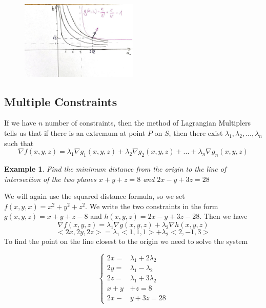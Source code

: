 \documentclass[]{article}
\newtheorem{example}{Example}
\begin{document}
\begin{figure}[h]
    \centering
    \includegraphics[width=0.50\textwidth]{ex2.jpg}
\end{figure}



\subsection{Multiple Constraints}
If we have $n$ number of constraints, then the method of Lagrangian Multiplers tells us that if there is an extremum at point $P$ on $S$, then there exist $\lambda_1,\lambda_2,...,\lambda_n$ such that
$$
    \nabla f(x,y,z) = \lambda_1 \nabla g_1(x,y,z) + \lambda_2 \nabla g_2(x,y,z) + ... + \lambda_n \nabla g_n(x,y,z)
$$

\begin{example}
    Find the minimum distance from the origin to the line of intersection of the two planes $x+y+z=8$ and $2x-y+3z=28$ 
\end{example}

We will again use the squared distance formula, so we set $f(x,y,x)=x^2+y^2+z^2$. We write the two constraints in the form $g(x,y,z)=x+y+z-8$ and $h(x,y,z)=2x-y+3z-28$. Then we have
$$
    \nabla f(x,y,z) = \lambda_1 \nabla g(x,y,z) + \lambda_2 \nabla h(x,y,z)
$$
$$
    <2x,2y,2z> = \lambda_1<1,1,1> + \lambda_2<2,-1,3>
$$
To find the point on the line closest to the origin we need to solve the system

\begin{equation*}
    \left\{
    \begin{alignedat}{3}
        2x= & \lambda_1 + 2\lambda_2 \\
        2y= &  \lambda_1 - \lambda_2 \\
        2z= &  \lambda_1 + 3\lambda_2 \\
        x+y & +z=8 \\
        2x - & y +3z = 28
    \end{alignedat}
    \right.
\end{equation*}
\end{document}
